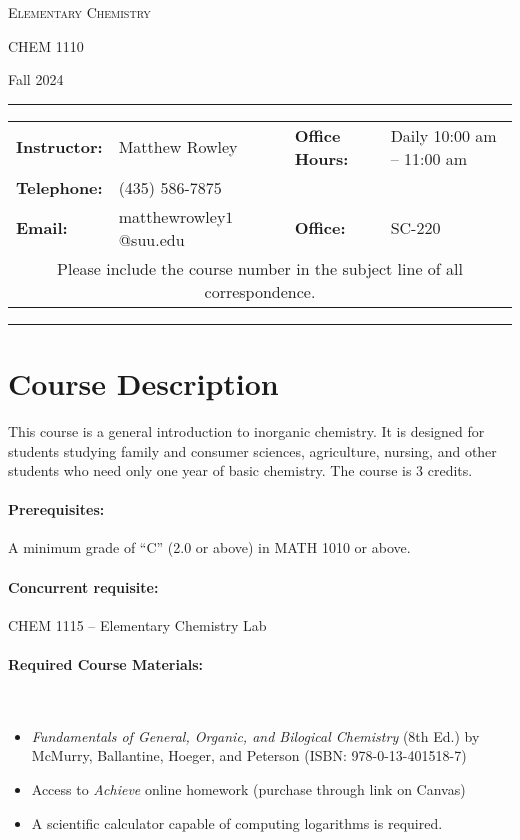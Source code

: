 \documentclass[12pt, letterpaper]{article}
\begin{document}
\begin{center}
	{\Large \textsc{Elementary Chemistry}}

	CHEM 1110
\end{center}
\begin{center}
	{\large Fall 2024}
\end{center}
\begin{center}
	\rule{0.99\textwidth}{0.4pt}
	\begin{tabular}{llcll}
		\textbf{Instructor:} & Matthew Rowley           &  & \textbf{Office Hours:} & Daily 10:00 am -- 11:00 am \\
		\textbf{Telephone:}  & (435) 586-7875           &  &                        &  \\
		\textbf{Email:}      & matthewrowley$1$@suu.edu &  & \textbf{Office:}       & SC-220                   \\
		\multicolumn{5}{c}{Please include the course number in the subject line of all correspondence.}
	\end{tabular}
	\rule{0.99\textwidth}{0.4pt}
\end{center}

\section*{Course Description}
This course is a general introduction to inorganic chemistry. It is designed for students studying family and consumer sciences, agriculture, nursing, and other students who need only one year of basic chemistry. The course is 3 credits.

\paragraph{Prerequisites:}
A minimum grade of ``C'' (2.0 or above) in MATH 1010 or above.

\paragraph{Concurrent requisite:}
CHEM 1115 -- Elementary Chemistry Lab

\paragraph{Required Course Materials:} ~

\begin{itemize}
	\item \emph{Fundamentals of General, Organic, and Bilogical Chemistry} (8th Ed.) by McMurry, Ballantine, Hoeger, and Peterson (ISBN: 978-0-13-401518-7)
	\item Access to \emph{Achieve} online homework (purchase through link on Canvas)
	\item A scientific calculator capable of computing logarithms is required.
\end{itemize}
\end{document}
